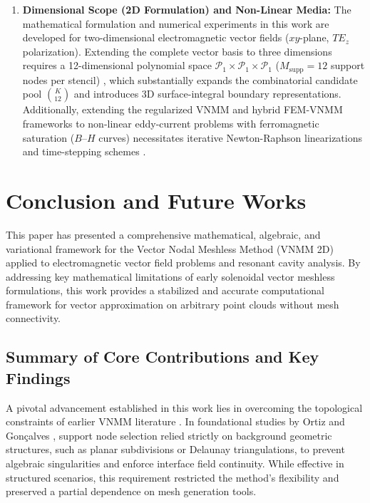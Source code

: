 \documentclass[preprint,12pt]{elsarticle}
\begin{document}
\begin{enumerate}
    \item \textbf{Dimensional Scope (2D Formulation) and Non-Linear Media:} 
    The mathematical formulation and numerical experiments in this work are developed for two-dimensional electromagnetic vector fields ($xy$-plane, $TE_z$ polarization). Extending the complete vector basis to three dimensions requires a 12-dimensional polynomial space $\mathcal{P}_1 \times \mathcal{P}_1 \times \mathcal{P}_1$ ($M_{\mathrm{supp}} = 12$ support nodes per stencil) \cite{goncalves2023vector}, which substantially expands the combinatorial candidate pool $\binom{K}{12}$ and introduces 3D surface-integral boundary representations. Additionally, extending the regularized VNMM and hybrid FEM-VNMM frameworks to non-linear eddy-current problems with ferromagnetic saturation ($B\text{--}H$ curves) necessitates iterative Newton-Raphson linearizations and time-stepping schemes \cite{tsukerman1992overlapping, coppoli2012induction}.
\end{enumerate}

\section{Conclusion and Future Works}
\label{sec:conclusion}

This paper has presented a comprehensive mathematical, algebraic, and variational framework for the Vector Nodal Meshless Method (VNMM 2D) applied to electromagnetic vector field problems and resonant cavity analysis. By addressing key mathematical limitations of early solenoidal vector meshless formulations, this work provides a stabilized and accurate computational framework for vector approximation on arbitrary point clouds without mesh connectivity.

\subsection{Summary of Core Contributions and Key Findings}
\label{subsec:summary_contributions}

A pivotal advancement established in this work lies in overcoming the topological constraints of earlier VNMM literature \cite{ortiz2023tese, goncalves2025tese}. In foundational studies by Ortiz \cite{ortiz2023tese} and Gonçalves \cite{goncalves2025tese}, support node selection relied strictly on background geometric structures, such as planar subdivisions or Delaunay triangulations, to prevent algebraic singularities and enforce interface field continuity. While effective in structured scenarios, this requirement restricted the method's flexibility and preserved a partial dependence on mesh generation tools. 
\end{document}
